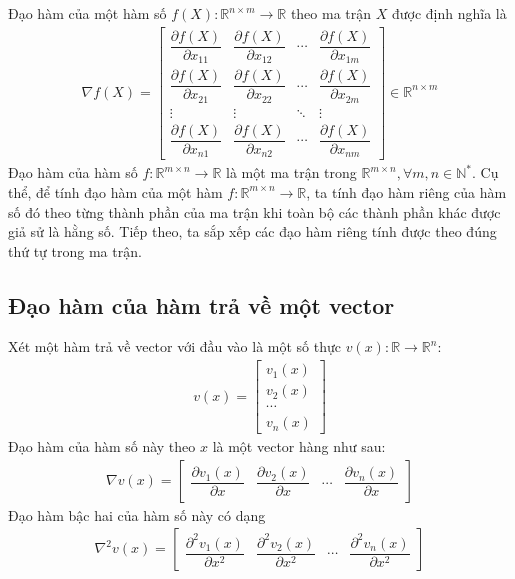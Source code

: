 \documentclass[12pt,a4paper]{report}
\begin{document}
	Đạo hàm của một hàm số $f(X): \mathbb{R}^{n \times m} \rightarrow \mathbb{R}$ theo ma trận $X$ được định nghĩa là \begin{eqnarray}
		\nabla f(X) = \begin{bmatrix}
			\dfrac{\partial f(X)}{\partial x_{11}}&\dfrac{\partial f(X)}{\partial x_{12}}&\cdots&\dfrac{\partial f(X)}{\partial x_{1m}} \\ 	\dfrac{\partial f(X)}{ \partial x_{21}}&\dfrac{\partial f(X)}{\partial x_{22}}&\cdots&\dfrac{\partial f(X)}{\partial x_{2m}} \\ \vdots & \vdots& \ddots& \vdots \\ 	\dfrac{\partial f(X)}{\partial x_{n1}}&\dfrac{\partial f(X)}{\partial x_{n2}}&\cdots&\dfrac{\partial f(X)}{\partial x_{nm}}
		\end{bmatrix} \in \mathbb{R}^{n \times m}
	\end{eqnarray} 
	Đạo hàm của hàm số $f: \mathbb{R}^{m \times n} \to \mathbb{R}$ là một ma trận trong $\mathbb{R}^{m \times n}, \forall m, n \in \mathbb{N}^*$. Cụ thể, để tính đạo hàm của một hàm $f: \mathbb{R}^{m \times n} \to \mathbb{R}$, ta tính đạo hàm riêng của hàm số đó theo từng thành phần của ma trận khi toàn bộ các thành phần khác được giả sử là hằng số. Tiếp theo, ta sắp xếp các đạo hàm riêng tính được theo đúng thứ tự trong ma trận.
	
	\subsection{Đạo hàm của hàm trả về một vector}
	Xét một hàm trả về vector với đầu vào là một số thực $v(x): \mathbb{R} \to \mathbb{R}^n$: \begin{eqnarray}
		v(x) = \begin{bmatrix}
			v_1(x)\\v_2(x)\\ \cdots \\ v_n(x)
		\end{bmatrix}
	\end{eqnarray} Đạo hàm của hàm số này theo $x$ là một vector hàng như sau: \begin{eqnarray}
		\nabla v(x) = \begin{bmatrix}
			\dfrac{\partial v_1(x)}{\partial x} & 	\dfrac{\partial v_2(x)}{\partial x} & \cdots & 	\dfrac{\partial v_n(x)}{\partial x}
		\end{bmatrix}
	\end{eqnarray} Đạo hàm bậc hai của hàm số này có dạng \begin{eqnarray}
		\nabla^2 v(x) = \begin{bmatrix}
			\dfrac{\partial^2 v_1(x)}{\partial x^2} & 	\dfrac{\partial^2 v_2(x)}{\partial x^2} & \cdots & 	\dfrac{\partial^2 v_n(x)}{\partial x^2}
		\end{bmatrix}
	\end{eqnarray}
\end{document}
